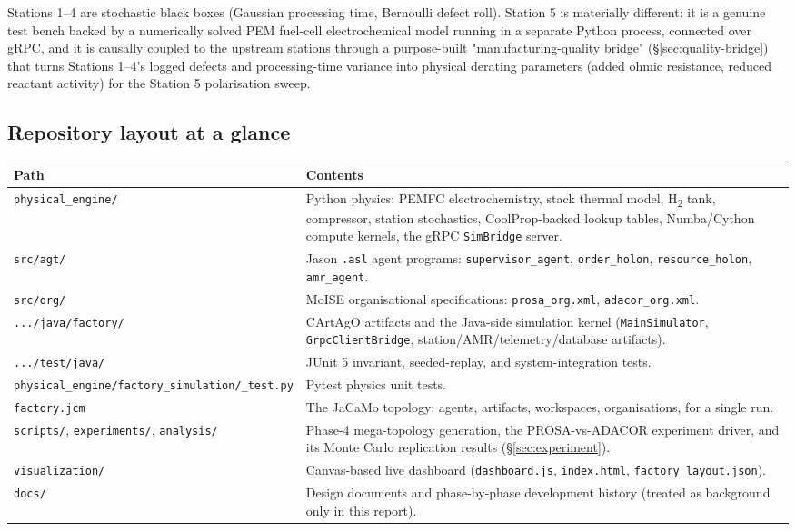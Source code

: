\documentclass[twocolumn,10pt,a4paper]{article}
\newcommand{\code}[1]{\texttt{\small #1}}
\newcommand{\file}[1]{\texttt{#1}}
\begin{document}
Stations 1--4 are stochastic black boxes (Gaussian processing time, Bernoulli defect roll). Station 5 is materially different: it is a genuine test bench backed by a numerically solved PEM fuel-cell electrochemical model running in a separate Python process, connected over gRPC, and it is causally coupled to the upstream stations through a purpose-built "manufacturing-quality bridge" (\S\ref{sec:quality-bridge}) that turns Stations 1--4's logged defects and processing-time variance into physical derating parameters (added ohmic resistance, reduced reactant activity) for the Station 5 polarisation sweep.

\subsection{Repository layout at a glance}
\begin{table}[t]
\centering
\small
\begin{tabular}{@{}p{3.0cm}p{13.5cm}@{}}
\toprule
\textbf{Path} & \textbf{Contents} \\
\midrule
\file{physical\_engine/} & Python physics: PEMFC electrochemistry, stack thermal model, H\textsubscript{2} tank, compressor, station stochastics, CoolProp-backed lookup tables, Numba/Cython compute kernels, the gRPC \code{SimBridge} server. \\
\file{src/agt/} & Jason \code{.asl} agent programs: \code{supervisor\_agent}, \code{order\_holon}, \code{resource\_holon}, \code{amr\_agent}. \\
\file{src/org/} & MoISE organisational specifications: \code{prosa\_org.xml}, \code{adacor\_org.xml}. \\
\file{.../java/factory/} & CArtAgO artifacts and the Java-side simulation kernel (\code{MainSimulator}, \code{GrpcClientBridge}, station/AMR/telemetry/database artifacts). \\
\file{.../test/java/} & JUnit 5 invariant, seeded-replay, and system-integration tests. \\
\file{physical\_engine/\allowbreak factory\_simulation/\allowbreak *\_test.py} & Pytest physics unit tests. \\
\file{factory.jcm} & The JaCaMo topology: agents, artifacts, workspaces, organisations, for a single run. \\
\file{scripts/}, \file{experiments/}, \file{analysis/} & Phase-4 mega-topology generation, the PROSA-vs-ADACOR experiment driver, and its Monte Carlo replication results (\S\ref{sec:experiment}). \\
\file{visualization/} & Canvas-based live dashboard (\file{dashboard.js}, \file{index.html}, \file{factory\_layout.json}). \\
\file{docs/} & Design documents and phase-by-phase development history (treated as background only in this report). \\
\bottomrule
\end{tabular}
\end{table}
\end{document}
